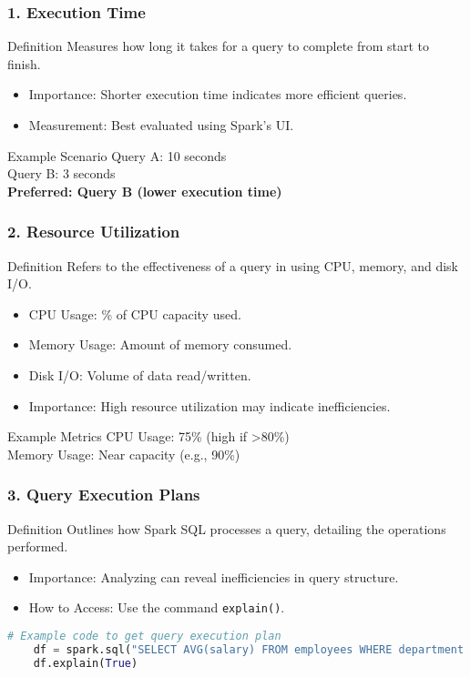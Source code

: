\documentclass[aspectratio=169]{beamer}
\begin{document}
\begin{frame}[fragile]
    \frametitle{1. Execution Time}
    \begin{block}{Definition}
        Measures how long it takes for a query to complete from start to finish.
    \end{block}
    \begin{itemize}
        \item Importance: Shorter execution time indicates more efficient queries.
        \item Measurement: Best evaluated using Spark's UI.
    \end{itemize}
    \begin{block}{Example Scenario}
        Query A: 10 seconds \\
        Query B: 3 seconds \\
        \textbf{Preferred: Query B (lower execution time)}
    \end{block}
\end{frame}

\begin{frame}[fragile]
    \frametitle{2. Resource Utilization}
    \begin{block}{Definition}
        Refers to the effectiveness of a query in using CPU, memory, and disk I/O.
    \end{block}
    \begin{itemize}
        \item CPU Usage: \% of CPU capacity used.
        \item Memory Usage: Amount of memory consumed.
        \item Disk I/O: Volume of data read/written.
        \item Importance: High resource utilization may indicate inefficiencies.
    \end{itemize}
    \begin{block}{Example Metrics}
        CPU Usage: 75\% (high if >80\%) \\
        Memory Usage: Near capacity (e.g., 90\%)
    \end{block}
\end{frame}

\begin{frame}[fragile]
    \frametitle{3. Query Execution Plans}
    \begin{block}{Definition}
        Outlines how Spark SQL processes a query, detailing the operations performed.
    \end{block}
    \begin{itemize}
        \item Importance: Analyzing can reveal inefficiencies in query structure.
        \item How to Access: Use the command \texttt{explain()}.
    \end{itemize}
    \begin{lstlisting}[language=Python]
    # Example code to get query execution plan
    df = spark.sql("SELECT AVG(salary) FROM employees WHERE department = 'Sales'")
    df.explain(True)
    \end{lstlisting}
\end{frame}
\end{document}
